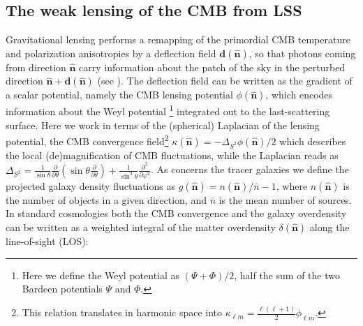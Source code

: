 \documentclass[a4paper,11pt]{article}
\newcommand{\nver}{\hat{\mathbf{n}}}
\begin{document}
\subsection{The weak lensing of the CMB from LSS}
\label{sec:xcorr-need-theo}

Gravitational lensing performs a remapping of the primordial CMB temperature and polarization 
anisotropies by a deflection
field $\mathbf{d}(\nver)$, so that photons coming from direction $\nver$ carry information about the patch 
of the sky in the perturbed direction $\nver + \mathbf{d}(\nver)$ (see \cite{Lewis2006}). 
The deflection field can be written as the gradient of a scalar potential, namely
the CMB lensing potential $\phi(\nver)$, which encodes information about the Weyl potential
\footnote{Here we define the Weyl potential as $(\Psi+\Phi)/2$, half the sum of the two Bardeen potentials 
$\Psi$ and $\Phi$.}
integrated out to the last-scattering surface. Here we work in terms of the (spherical) Laplacian of the 
lensing potential,
the CMB convergence field\footnote{This relation translates in harmonic space into 
$\kappa_{\ell m} = \frac{\ell(\ell+1)}{2}\phi_{\ell m}$.}  $\kappa(\nver) = -\Delta_{S^2}\phi(\nver)/2$ which 
describes the local (de)magnification of CMB fluctuations, while the Laplacian reads as 
$\Delta_{S^2}=\frac{1}{\sin\theta}\frac
{\partial}{\partial\theta}
\left(\sin\theta\frac{\partial}{\partial\theta}\right)+\frac{1}{\sin^2\theta}\frac{\partial^2}{\partial\varphi^2}$. As concerns the tracer galaxies we define the projected galaxy density fluctuations 
as $g(\nver)= n(\nver)/\bar{n}-1$, where $n(\nver)$ is the number of objects in a given direction, and $\bar{n}$ is the mean
number of sources. In standard cosmologies both the CMB convergence and the galaxy overdensity can be written as a weighted 
integral of the matter overdensity $\delta(\nver)$ along the line-of-sight (LOS):
%
\end{document}
